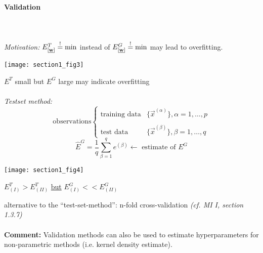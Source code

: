 \paragraph{Validation}\mbox{}
\\\\
\emph{Motivation:} $E_{[\underline{\mathbf{w}}]}^T \stackrel{\mathrm{!}}{=} \min$ instead of $E_{[\underline{\mathbf{w}}]}^G \stackrel{\mathrm{!}}{=} \min$ may lead to overfitting.
\begin{center}\texttt{[image: section1\_fig3]}
\end{center}
$E^T$ small but $E^G$ large may indicate overfitting
\\\\
\emph{Testset method:}
\[ \text{observations} \left\{ \begin{array}{ll}
	\text{training data} & \big\{ \vec{x}^{(\alpha)} \big\}, \alpha = 1, 
		\ldots, p \\\\
	\text{test data} & \big\{ \vec{x}^{(\beta)} \big\}, \beta = 1, 
		\ldots, q
\end{array} \right. \]
\begin{equation}
	\widehat{E}^G = \frac{1}{q} \sum\limits_{\beta = 1}^q e^{(\beta)}
		\leftarrow \text{ estimate of } E^G
\end{equation}
\begin{center}\texttt{[image: section1\_fig4]}
\end{center}
\begin{itemize}
	\itR $E_{(I)}^T > E_{(II)}^T$ \underline{but} $E_{(I)}^G << E_{(II)}^G$
\end{itemize}
alternative to the ``test-set-method'': n-fold cross-validation {\it
  (cf. MI I, section 1.3.7)}
\\\\
\textbf{Comment:} Validation methods can also be used to estimate
hyperparameters for non-parametric methods (i.e. kernel density
estimate).




